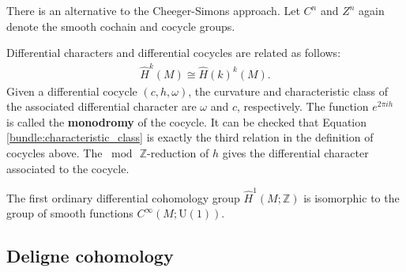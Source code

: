     There is an alternative to the Cheeger-Simons approach. Let $C^n$ and $Z^n$ again denote the smooth cochain and cocycle groups.
    \begin{property}
        Differential characters and differential cocycles are related as follows:
        \begin{gather}
            \hat{H}^k(M)\cong\hat{H}(k)^k(M).
        \end{gather}
        Given a differential cocycle $(c,h,\omega)$, the curvature and characteristic class of the associated differential character are $\omega$ and $c$, respectively. The function $e^{2\pi ih}$ is called the \textbf{monodromy} of the cocycle. It can be checked that Equation \eqref{bundle:characteristic_class} is exactly the third relation in the definition of cocycles above. The $\bmod\,\mathbb{Z}$-reduction of $h$ gives the differential character associated to the cocycle.
    \end{property}

    \begin{example}
        The first ordinary differential cohomology group $\hat{H}^1(M;\mathbb{Z})$ is isomorphic to the group of smooth functions $C^\infty(M;\mathrm{U}(1))$.
    \end{example}

\subsection{Deligne cohomology}

